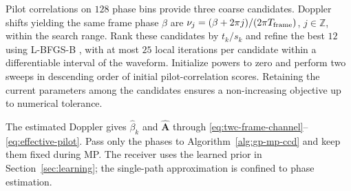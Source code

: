 Pilot correlations on $128$ phase bins provide three coarse candidates.
Doppler shifts yielding the same frame phase $\beta$ are
$\nu_j=(\beta+2\pi j)/(2\pi T_{\rm frame})$, $j\in\mathbb Z$,
within the search range. Rank these candidates by $t_k/s_k$ and refine
the best $12$ using L-BFGS-B \cite{zhu1997}, with at most $25$ local
iterations per candidate within a differentiable interval of the waveform.
Initialize powers to zero and perform two sweeps in descending order of
initial pilot-correlation scores. Retaining the current parameters among
the candidates ensures a non-increasing objective up to numerical tolerance.

The estimated Doppler gives $\widehat\beta_k$ and $\widehat{\mathbf A}$
through \eqref{eq:twc-frame-channel}--\eqref{eq:effective-pilot}.
Pass only the phases to Algorithm~\ref{alg:gp-mp-ccd} and keep them fixed
during MP. The receiver uses the learned prior in Section~\ref{sec:learning};
the single-path approximation is confined to phase estimation.
